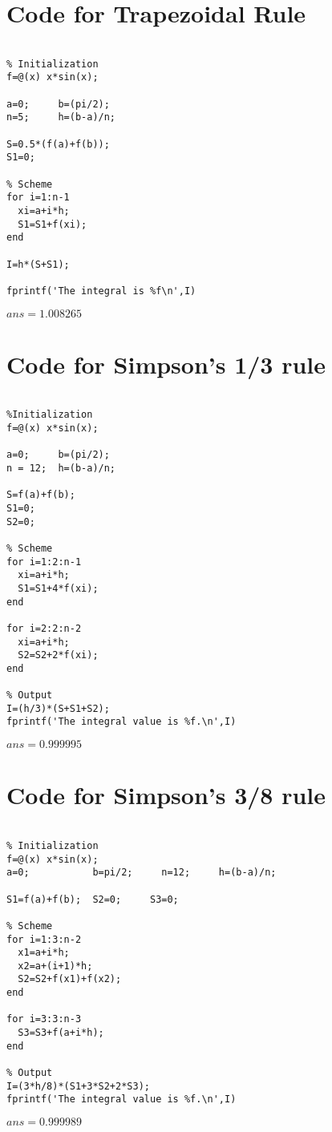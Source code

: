 \section{Code for Trapezoidal Rule}
\begin{verbatim}

% Initialization
f=@(x) x*sin(x);

a=0;     b=(pi/2);
n=5;     h=(b-a)/n;

S=0.5*(f(a)+f(b));
S1=0;

% Scheme
for i=1:n-1
  xi=a+i*h;
  S1=S1+f(xi);
end

I=h*(S+S1);

fprintf('The integral is %f\n',I)

\end{verbatim}
\(ans=1.008265\)


\section{Code for Simpson's 1/3 rule}
\begin{verbatim}

%Initialization
f=@(x) x*sin(x);

a=0;     b=(pi/2);
n = 12;  h=(b-a)/n;

S=f(a)+f(b);
S1=0;
S2=0;

% Scheme
for i=1:2:n-1
  xi=a+i*h;
  S1=S1+4*f(xi);
end

for i=2:2:n-2
  xi=a+i*h;
  S2=S2+2*f(xi);
end

% Output
I=(h/3)*(S+S1+S2);
fprintf('The integral value is %f.\n',I)

\end{verbatim}
\(ans=0.999995\)

\clearpage
\section{Code for Simpson's 3/8 rule}
\begin{verbatim}

% Initialization
f=@(x) x*sin(x);
a=0;           b=pi/2;     n=12;     h=(b-a)/n;

S1=f(a)+f(b);  S2=0;     S3=0;

% Scheme
for i=1:3:n-2
  x1=a+i*h;
  x2=a+(i+1)*h;
  S2=S2+f(x1)+f(x2);
end

for i=3:3:n-3
  S3=S3+f(a+i*h);
end

% Output
I=(3*h/8)*(S1+3*S2+2*S3);
fprintf('The integral value is %f.\n',I)

\end{verbatim}

\(ans=0.999989\)
